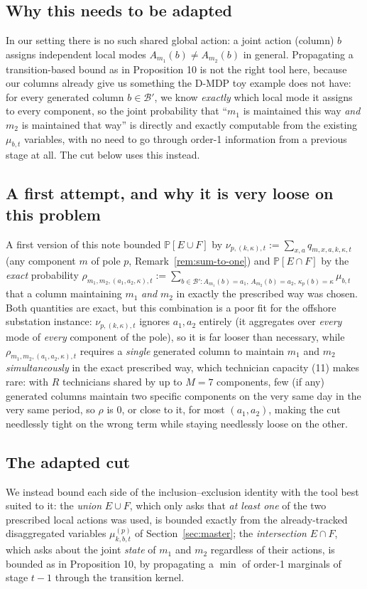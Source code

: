 \documentclass[11pt]{article}
\begin{document}
\subsection*{Why this needs to be adapted}
In our setting there is no such shared global action: a joint action (column) $b$ assigns
independent local modes $A_{m_1}(b) \ne A_{m_2}(b)$ in general. Propagating a
transition-based bound as in Proposition 10 is not the right tool here, because our
columns already give us something the D-MDP toy example does not have: for every
generated column $b \in \mathcal B'$, we know \emph{exactly} which local mode it assigns
to every component, so the joint probability that ``$m_1$ is maintained this way \emph{and}
$m_2$ is maintained that way'' is directly and exactly computable from the existing
$\mu_{b,t}$ variables, with no need to go through order-1 information from a previous
stage at all. The cut below uses this instead.

\subsection*{A first attempt, and why it is very loose on this problem}
\label{sec:lift-project-first-attempt}
A first version of this note bounded $\mathbb P[E \cup F]$ by
$\nu_{p,(k,\kappa),t} := \sum_{x,a} q_{m,x,a,k,\kappa,t}$ (any component $m$ of pole $p$,
Remark~\ref{rem:sum-to-one}) and $\mathbb P[E \cap F]$ by the \emph{exact} probability
$\rho_{m_1,m_2,(a_1,a_2,\kappa),t} := \sum_{b \in \mathcal B': A_{m_1}(b)=a_1,\,
A_{m_2}(b)=a_2,\, \kappa_p(b)=\kappa} \mu_{b,t}$ that a column maintaining $m_1$ \emph{and}
$m_2$ in exactly the prescribed way was chosen. Both quantities are exact, but this
combination is a poor fit for the offshore substation instance:
$\nu_{p,(k,\kappa),t}$ ignores $a_1, a_2$ entirely (it aggregates over \emph{every} mode of
\emph{every} component of the pole), so it is far looser than necessary, while
$\rho_{m_1,m_2,(a_1,a_2,\kappa),t}$ requires a \emph{single} generated column to maintain
$m_1$ and $m_2$ \emph{simultaneously} in the exact prescribed way, which technician
capacity (11) makes rare: with $R$ technicians shared by up to $M=7$ components,
few (if any) generated columns maintain two specific components on the very same day in
the very same period, so $\rho$ is $0$, or close to it, for most $(a_1,a_2)$, making the
cut needlessly tight on the wrong term while staying needlessly loose on the other.

\subsection*{The adapted cut}
We instead bound each side of the inclusion--exclusion identity with the tool best suited
to it: the \emph{union} $E \cup F$, which only asks that \emph{at least one} of the two
prescribed local actions was used, is bounded exactly from the already-tracked
disaggregated variables $\mu^{(p)}_{k,b,t}$ of Section~\ref{sec:master}; the
\emph{intersection} $E \cap F$, which asks about the joint \emph{state} of $m_1$ and
$m_2$ regardless of their actions, is bounded as in Proposition 10, by propagating a
$\min$ of order-1 marginals of stage $t-1$ through the transition kernel.
\end{document}

